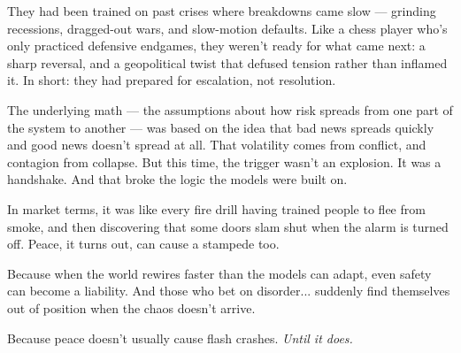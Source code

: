 \medskip

They had been trained on past crises where breakdowns came slow — grinding recessions, dragged-out wars, and slow-motion defaults. 
Like a chess player who's only practiced defensive endgames, they weren’t ready for what came next: a sharp reversal, and a 
geopolitical twist that defused tension rather than inflamed it. In short: they had prepared for escalation, not resolution.

The underlying math — the assumptions about how risk spreads from one part of the system to another — was based on the idea 
that bad news spreads quickly and good news doesn’t spread at all. That volatility comes from conflict, and contagion from 
collapse. But this time, the trigger wasn’t an explosion. It was a handshake. And that broke the logic the models were built on.

In market terms, it was like every fire drill having trained people to flee from smoke, and then discovering that some doors 
slam shut when the alarm is turned off.
Peace, it turns out, can cause a stampede too.

Because when the world rewires faster than the models can adapt, even safety can become a liability.
And those who bet on disorder... suddenly find themselves out of position when the chaos doesn’t arrive.

Because peace doesn’t usually cause flash crashes.  \textit{Until it does.}

\medskip

